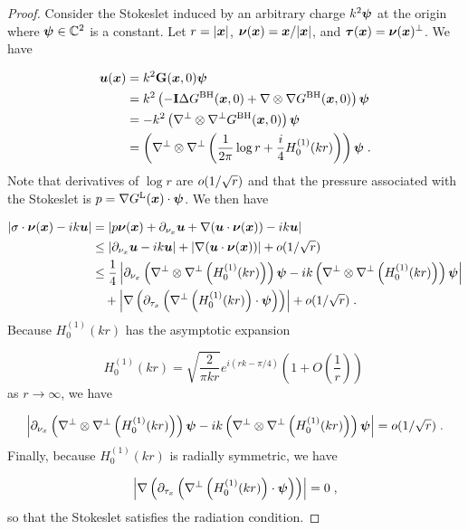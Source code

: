 \begin{proof}
Consider the Stokeslet induced by an arbitrary charge
$k^2 {\boldsymbol \psi}$ at the origin where ${\boldsymbol \psi} \in \mathbb{C}^2$ 
is a constant. Let $r = |{\boldsymbol x}|$,
${\boldsymbol \nu}({\boldsymbol x}) = {\boldsymbol x}/|{\boldsymbol x}|$, and ${\boldsymbol \tau}({\boldsymbol x}) = {\boldsymbol \nu}({\boldsymbol x})^\perp$. We have

\begin{align*}
{\boldsymbol u} ({\boldsymbol x}) &= k^2 {\bf G}({\boldsymbol x},0) {\boldsymbol \psi} \\
&= k^2 \left (-{\bf I} \Delta G^{\textrm{BH}}({\boldsymbol x},0)
+ \nabla \otimes \nabla G^{\textrm{BH}}({\boldsymbol x},0)\right ) {\boldsymbol \psi} \\
&= -k^2 \left (\nabla^\perp \otimes \nabla^\perp G^{\textrm{BH}}({\boldsymbol x},0) \right) {\boldsymbol \psi} \\
&= \left(\nabla^\perp \otimes \nabla^\perp \left ( \frac{1}{2\pi}
\log r + \frac{i}{4} H_0^{(1)} (kr) \right ) \right){\boldsymbol \psi} \; .
\end{align*}
Note that derivatives of $\log r$ are $o (1/\sqrt{r})$
and that the pressure associated with the Stokeslet is
$p = \nabla G^{\textrm{L}}({\boldsymbol x}) \cdot {\boldsymbol \psi}$. We then have

\begin{align*}
\left | \sigma \cdot {\boldsymbol \nu}({\boldsymbol x}) - i k {\boldsymbol u} \right | &=
\left | p {\boldsymbol \nu}({\boldsymbol x}) + \partial_{{\nu_x}} {\boldsymbol u} + \nabla ({\boldsymbol u} \cdot {\boldsymbol \nu}({\boldsymbol x}))
- ik {\boldsymbol u} \right | \\
&\leq \left | \partial_{{\nu_x}} {\boldsymbol u} - ik{\boldsymbol u} \right | + \left | \nabla({\boldsymbol u} \cdot {\boldsymbol \nu}({\boldsymbol x})) \right |
+ o (1/\sqrt{r}) \\
&\leq \frac{1}{4} \left | \partial_{{\nu_x}} \left(\nabla^\perp \otimes
\nabla^\perp \left (H_0^{(1)} (kr) \right ) \right){\boldsymbol \psi}
- i k \left(\nabla^\perp \otimes \nabla^\perp
\left (H_0^{(1)} (kr) \right ) \right){\boldsymbol \psi} \right | \\
& \quad + \left | \nabla \left( \partial_{\tau_x} \left ( 
\nabla^\perp \left (H_0^{(1)} (kr) \right ) \cdot {\boldsymbol \psi}  \right )
\right) \right | + o (1/\sqrt{r}) \; .
\end{align*}
Because $H_0^{(1)}(kr)$ has the asymptotic expansion 

\begin{equation}
H_0^{(1)}(kr) = \sqrt{\frac{2}{\pi k r}} e^{i(rk-\pi/4)} \left ( 1 + O\left (
\frac{1}{r} \right ) \right ) \; \nonumber
\end{equation}
as $r\to \infty$, we have

\begin{equation}
\left | \partial_{{\nu_x}} \left(\nabla^\perp \otimes
\nabla^\perp \left (H_0^{(1)} (kr) \right ) \right){\boldsymbol \psi}
- ik \left(\nabla^\perp \otimes \nabla^\perp
\left (H_0^{(1)} (kr) \right ) \right){\boldsymbol \psi} \right | =
o ( 1/\sqrt{r} ) \; . \nonumber
\end{equation}
Finally, because $H_0^{(1)}(kr)$ is radially symmetric,
we have

\begin{equation}
\left | \nabla \left( \partial_{\tau_x} \left ( 
\nabla^\perp \left (H_0^{(1)} (kr) \right ) \cdot {\boldsymbol \psi}  \right )
\right) \right | = 0 \; , \nonumber
\end{equation}
so that the Stokeslet satisfies the radiation condition.
\end{proof}
